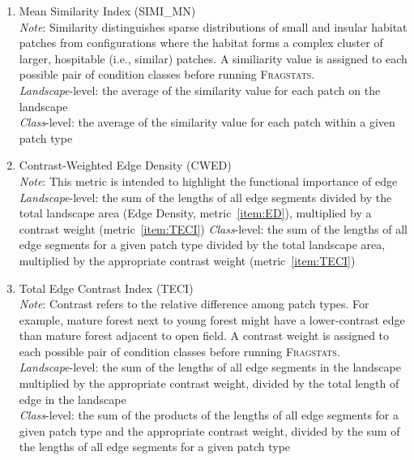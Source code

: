 \begin{enumerate}
	\item Mean Similarity Index (SIMI\_MN)\\
	\emph{Note}: Similarity distinguishes sparse distributions of small and insular habitat patches from configurations where the habitat forms a complex cluster of larger, hospitable (i.e., similar) patches. A similiarity value is assigned to each possible pair of condition classes before running \textsc{Fragstats}. 	\\
	\emph{Landscape}-level: the average of the similarity value for each patch on the landscape \\
	\emph{Class}-level: the average of the similarity value for each patch within a given patch type \\
	
	\item Contrast-Weighted Edge Density (CWED)\\
	\emph{Note}: This metric is intended to highlight the functional importance of edge	\\
	\emph{Landscape}-level: the sum of the lengths of all edge segments divided by the total landscape area (Edge Density, metric~\ref{item:ED}), multiplied by a contrast weight (metric~\ref{item:TECI})
	\emph{Class}-level: the sum of the lengths of all edge segments for a given patch type divided by the total landscape area, multiplied by the appropriate contrast weight (metric~\ref{item:TECI})  	\\

	\item Total Edge Contrast Index (TECI) \\
	\label{item:TECI}
	\emph{Note}: Contrast refers to the relative difference among patch types. For example, mature forest next to young forest might have a lower-contrast edge than mature forest adjacent to open field. A contrast weight is assigned to each possible pair of condition classes before running \textsc{Fragstats}. 	\\
	\emph{Landscape}-level: the sum of the lengths of all edge segments in the landscape multiplied by the appropriate contrast weight, divided by the total length of edge in the landscape\\
	\emph{Class}-level: the sum of the products of the lengths of all edge segments for a given patch type and the appropriate contrast weight, divided by the sum of the lengths of all edge segments for a given patch type \\



\end{enumerate}
